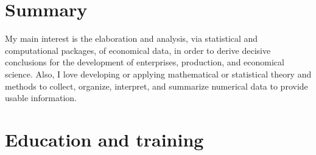 \documentclass[letterpaper]{engineer_cv} %
\begin{document}
	\makeprofile %


	\section{Summary}

	My main interest is the elaboration and analysis, via statistical and computational packages, of economical data, in order to derive decisive conclusions for the development of enterprises, production, and economical science. Also, I love developing or applying mathematical or statistical theory and methods to collect, organize, interpret, and summarize numerical data to provide usable information.


	\section{Education and training}
\end{document}
